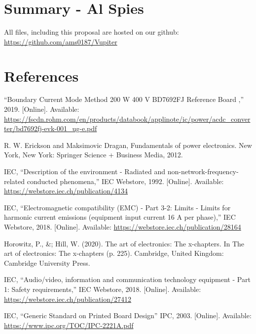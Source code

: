 \documentclass[15pt]{article}
\begin{document}
\section{Summary - Al Spies}

\noindent


All files, including this proposal are hosted on our github:\\
\url{https://github.com/ams0187/Vupiter}
\pagebreak
\raggedright
\section{References}
\begingroup
\renewcommand{\section}[2]{}
\begin{thebibliography}{}
    “Boundary Current Mode Method 200 W 400 V BD7692FJ Reference Board ,” 2019. [Online]. Available: \url{https://fscdn.rohm.com/en/products/databook/applinote/ic/power/acdc_converter/bd7692fj-evk-001_ug-e.pdf}

    R. W. Erickson and Maksimovic Dragan, Fundamentals of power electronics. New York, New York: Springer Science + Business Media, 2012.

    IEC, “Description of the environment - Radiated and non-network-frequency-related conducted phenomena,” IEC Webstore, 1992. [Online]. Available: 
    \url{https://webstore.iec.ch/publication/4134}

    IEC, “Electromagnetic compatibility (EMC) - Part 3-2: Limits - Limits for harmonic current emissions (equipment input current 16 A per phase),” IEC Webstore, 2018. [Online]. Available:
    \url{https://webstore.iec.ch/publication/28164}

    Horowitz, P., \&; Hill, W. (2020). The art of electronics: The x-chapters. In The art of electronics: The x-chapters (p. 225). Cambridge, United Kingdom: Cambridge University Press.

    IEC, “Audio/video, information and communication technology equipment - Part 1: Safety requirements,” IEC Webstore, 2018. [Online]. Available: 
    \url{https://webstore.iec.ch/publication/27412}

    IEC, “Generic Standard on Printed Board Design” IPC, 2003. [Online]. Available: \url{https://www.ipc.org/TOC/IPC-2221A.pdf}


\end{thebibliography}
\end{document}

